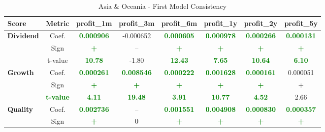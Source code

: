 \documentclass[11pt,english,a4paper,hidelinks]{book}
\begin{document}
\begin{table}[H]
    \centering
    \caption{Asia \& Oceania - First Model Consistency}
    \begin{tabular}{lccccccc}
        \toprule
        \textbf{Score} & \textbf{Metric} & \textbf{profit\_1m} & \textbf{profit\_3m} & \textbf{profit\_6m} & \textbf{profit\_1y} & \textbf{profit\_2y} & \textbf{profit\_5y} \\
        \midrule
        \multirow{3}{*}{\textbf{Dividend}} 
            & Coef. & \textbf{\textcolor{green}{0.000906}} & -0.000652 & \textbf{\textcolor{green}{0.000605}} & \textbf{\textcolor{green}{0.000978}} & \textbf{\textcolor{green}{0.000266}} & \textbf{\textcolor{green}{0.000131}} \\
            & Sign & \textbf{\textcolor{green}{+}} & – & \textbf{\textcolor{green}{+}} & \textbf{\textcolor{green}{+}} & \textbf{\textcolor{green}{+}} & \textbf{\textcolor{green}{+}} \\
            & t-value & \textbf{\textcolor{green}{10.78}} & -1.80 & \textbf{\textcolor{green}{12.43}} & \textbf{\textcolor{green}{7.65}} & \textbf{\textcolor{green}{10.64}} & \textbf{\textcolor{green}{6.10}} \\
        \midrule
        \multirow{3}{*}{\textbf{Growth}} 
            & Coef. & \textbf{\textcolor{green}{0.000261}} & \textbf{\textcolor{green}{0.008546}} & \textbf{\textcolor{green}{0.000222}} & \textbf{\textcolor{green}{0.001628}} & \textbf{\textcolor{green}{0.000161}} & 0.000051 \\
            & Sign & \textbf{\textcolor{green}{+}} & \textbf{\textcolor{green}{+}} & \textbf{\textcolor{green}{+}} & \textbf{\textcolor{green}{+}} & \textbf{\textcolor{green}{+}} & + \\
            & \textbf{\textcolor{green}{t-value}} & \textbf{\textcolor{green}{4.11}} & \textbf{\textcolor{green}{19.48}} & \textbf{\textcolor{green}{3.91}} & \textbf{\textcolor{green}{10.77}} & \textbf{\textcolor{green}{4.52}} & 2.66 \\
        \midrule
        \multirow{3}{*}{\textbf{Quality}} 
            & Coef. & \textbf{\textcolor{green}{0.002736}} & -- & \textbf{\textcolor{green}{0.001551}} & \textbf{\textcolor{green}{0.004908}} & \textbf{\textcolor{green}{0.000830}} & \textbf{\textcolor{green}{0.000357}} \\
            & Sign & \textbf{\textcolor{green}{+}} & 0 & \textbf{\textcolor{green}{+}} & \textbf{\textcolor{green}{+}} & \textbf{\textcolor{green}{+}} & \textbf{\textcolor{green}{+}} \\

\end{tabular}
\end{table}
\end{document}
